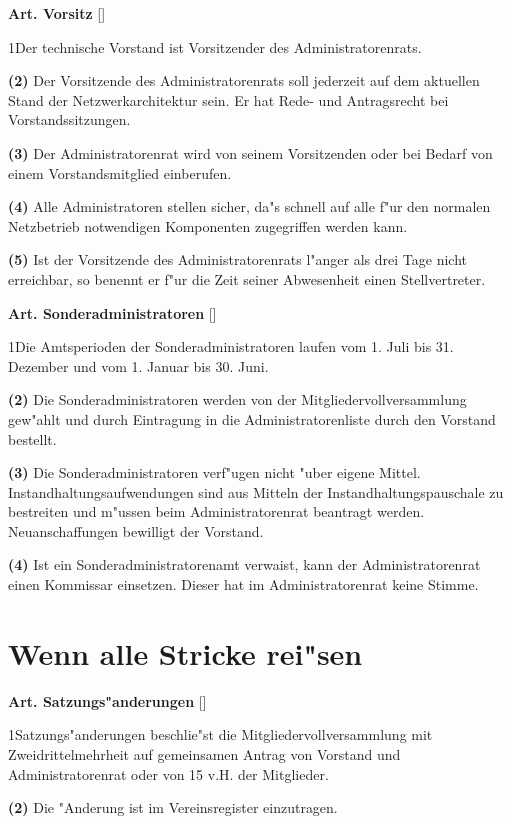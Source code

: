 \documentclass[12pt]{article}
\newcommand{\Abschnitt}[1]{\section{#1}}
\newcommand{\Satz}[2]{

\begin{samepage}
{\bf (#1)} #2
\end{samepage}
}
\newenvironment{Artikel}[2]{
\bigskip \centerline{{\bf Art. #1} [#2]}
\nopagebreak
}{
}
\begin{document}
\begin{Artikel}{27}{Vorsitz}

\Satz{1}{Der technische Vorstand ist Vorsitzender des Administratorenrats.}

\Satz{2}{Der Vorsitzende des Administratorenrats soll jederzeit auf dem 
aktuellen Stand der Netzwerkarchitektur sein. Er hat Rede- und Antragsrecht 
bei Vorstandssitzungen.}

\Satz{3}{Der Administratorenrat wird von seinem Vorsitzenden oder bei 
Bedarf von einem Vorstandsmitglied einberufen.}

\Satz{4}{Alle Administratoren stellen sicher, da"s schnell auf alle f"ur
den normalen Netzbetrieb notwendigen Komponenten zugegriffen werden kann.}

\Satz{5}{Ist der Vorsitzende des Administratorenrats l"anger als drei
Tage nicht erreichbar, so benennt er f"ur die Zeit seiner Abwesenheit
einen Stellvertreter.}

\end{Artikel}

\begin{Artikel}{28}{Sonderadministratoren}

\Satz{1}{Die Amtsperioden der Sonderadministratoren laufen vom 1. Juli bis
31. Dezember und vom 1. Januar bis 30. Juni.}

\Satz{2}{Die Sonderadministratoren werden von der Mitgliedervollversammlung
ge\-w"ahlt und durch Eintragung in die Administratorenliste durch den Vorstand
bestellt.}

\Satz{3}{Die Sonderadministratoren verf"ugen nicht "uber eigene Mittel.
Instandhaltungsaufwendungen sind aus Mitteln der Instandhaltungspauschale 
zu bestreiten und m"ussen beim Administratorenrat beantragt werden.
Neuanschaffungen bewilligt der Vorstand.}

\Satz{4}{Ist ein Sonderadministratorenamt verwaist, kann der 
Administratorenrat einen Kommissar einsetzen. Dieser hat im 
Administratorenrat keine Stimme.}

\end{Artikel}


\Abschnitt{Wenn alle Stricke rei"sen}

\begin{Artikel}{29}{Satzungs"anderungen}

\Satz{1}{Satzungs"anderungen beschlie"st die Mitgliedervollversammlung mit 
Zweidrittelmehrheit auf gemeinsamen Antrag von Vorstand und Administratorenrat
oder von 15 v.H. der Mitglieder.}

\Satz{2}{Die "Anderung ist im Vereinsregister einzutragen.}

\end{Artikel}
\end{document}
